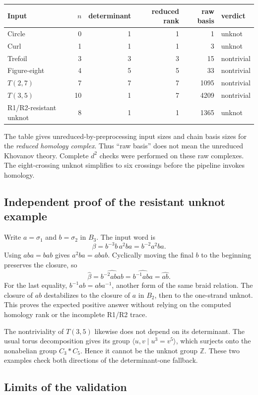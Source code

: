 \documentclass[11pt]{article}
\theoremstyle{definition}
\newcommand{\Z}{\mathbb Z}
\begin{document}
\begin{center}
\small
\begin{tabular}{lrrrrl}
\toprule
Input & $n$ & determinant & reduced rank & raw basis & verdict\\
\midrule
Circle & 0 & 1 & 1 & 1 & unknot\\
Curl & 1 & 1 & 1 & 3 & unknot\\
Trefoil & 3 & 3 & 3 & 15 & nontrivial\\
Figure-eight & 4 & 5 & 5 & 33 & nontrivial\\
$T(2,7)$ & 7 & 7 & 7 & 1095 & nontrivial\\
$T(3,5)$ & 10 & 1 & 7 & 4209 & nontrivial\\
R1/R2-resistant unknot & 8 & 1 & 1 & 1365 & unknot\\
\bottomrule
\end{tabular}
\end{center}
The table gives unreduced-by-preprocessing input sizes and chain basis sizes
for the \emph{reduced homology complex}. Thus ``raw basis'' does not mean the
unreduced Khovanov theory. Complete $d^2$ checks were performed on these raw
complexes. The eight-crossing unknot simplifies to six crossings before the
pipeline invokes homology.

\subsection{Independent proof of the resistant unknot example}

Write $a=\sigma_1$ and $b=\sigma_2$ in $B_3$. The input word is
\[
 \beta=b^{-3}b\,a^2ba=b^{-2}a^2ba.
\]
Using $aba=bab$ gives $a^2ba=abab$. Cyclically moving the final $b$ to the
beginning preserves the closure, so
\[
 \widehat\beta=\widehat{b^{-2}abab}
 =\widehat{b^{-1}aba}=\widehat{ab}.
\]
For the last equality, $b^{-1}ab=aba^{-1}$, another form of the same braid
relation. The closure of $ab$ destabilizes to the closure of $a$ in $B_2$,
then to the one-strand unknot. This proves the expected positive answer
without relying on the computed homology rank or the incomplete R1/R2 trace.

The nontriviality of $T(3,5)$ likewise does not depend on its determinant. The
usual torus decomposition gives its group
$\langle u,v\mid u^3=v^5\rangle$, which surjects onto the nonabelian group
$C_3*C_5$. Hence it cannot be the unknot group $\Z$. These two examples check
both directions of the determinant-one fallback.

\subsection{Limits of the validation}
\end{document}
